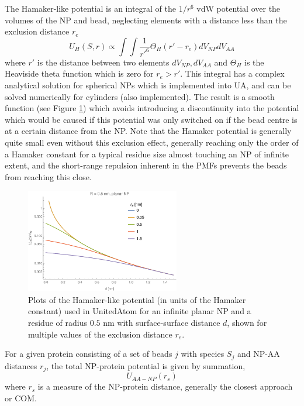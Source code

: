 \documentclass[10pt,a4paper,onecolumn]{report}
\begin{document}
 
 
  The Hamaker-like potential is an integral of the $1/r^6$ vdW potential over the volumes of the NP and bead, neglecting elements with a distance less than the exclusion distance $r_e$
 \begin{equation}
 U_H(S,r) \propto \int \int \frac{1}{r'^6} \Theta_H( r' - r_e)dV_{NP} dV_{AA}
 \end{equation}
 where $r'$ is the distance between two elements $dV_{NP}, dV_{AA}$ and $\Theta_H$ is the Heaviside theta function which is zero for $r_e > r'$. This integral has a complex analytical solution for spherical NPs which is implemented into UA, and can be solved numerically for cylinders (also implemented). The result is a smooth function (see Figure \ref{fig:hamaker-exclusion}) which avoids introducing a discontinuity into the potential which would be caused if this potential was only switched on if the bead centre is at a certain distance from the NP. Note that the Hamaker potential is generally quite small even without this exclusion effect, generally reaching only the order of a Hamaker constant for a typical residue size almost touching an NP of infinite extent, and the short-range repulsion inherent in the PMFs prevents the beads from reaching this close. 
 
 
\begin{figure} \label{fig:hamaker-exclusion}
    \centering
    \includegraphics[width=0.6\textwidth]{figures/hamaker_magnitude_perresidue.pdf}
    \caption{Plots of the Hamaker-like potential (in units of the Hamaker constant) used in UnitedAtom for an infinite planar NP and a residue of radius $0.5$ nm with surface-surface distance $d$, shown for multiple values of the exclusion distance $r_e$.}
\end{figure}
 
 
 
 
For a given protein consisting of a set of beads $j$ with species $S_j$ and NP-AA distances $r_j$, the total NP-protein potential is given by summation,
\begin{equation}
U_{AA-NP}(r_s)
\end{equation}
 where $r_s$ is a measure of the NP-protein distance, generally the closest approach or COM. 
 
\end{document}
